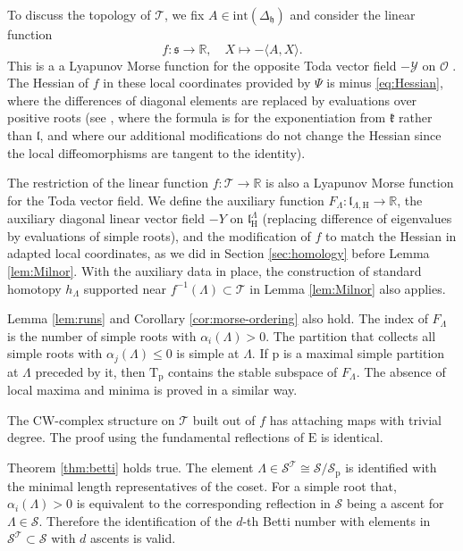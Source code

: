 \documentclass[reqno]{amsart}
\newcommand{\p}{\mathrm{p}}
\newcommand{\hh}{\mathfrak{h}}
\newcommand{\kk}{\mathfrak{k}}
\renewcommand{\ll}{\mathfrak{l}}
\renewcommand{\ss}{\mathfrak{s}}
\newcommand{\cO}{\mathcal{O}}
\newcommand{\cS}{\mathcal{S}}
\newcommand{\cT}{\mathcal{T}}
\newcommand{\cY}{\mathcal{Y}}
\newcommand{\R}{\mathbb{R}}
\newcommand{\E}{\mathrm{E}}
\newcommand{\T}{\mathbb{T}}
\renewcommand{\T}{\mathrm{T}}
\renewcommand{\H}{\mathrm{H}}
\begin{document}
To discuss the topology of $\cT$, we fix $A\in \mathrm{int}(\Delta_\hh)$ and consider the linear function
\[f:\ss\to \R,\quad X\mapsto -\langle A,X\rangle. \]
This is a a Lyapunov Morse function for the opposite  Toda vector field $-\cY$ on $\cO$ \cite[Lemma 1 and Proposition 7]{Fa}.
The Hessian of $f$ in these local coordinates provided by $\Psi$  is minus \eqref{eq:Hessian}, where the differences of diagonal elements are replaced by evaluations over positive roots (see \cite[Proposition 1.4]{DKV}, where the formula is for the exponentiation from $\kk$ rather than $\ll$, and where our additional modifications do not change the Hessian since the local diffeomorphisms are tangent to the identity).
%

The restriction of the linear function $f:\cT\to \R$
is also a Lyapunov Morse function for the Toda vector field.
We define the auxiliary function $F_\Lambda:\ll_{\Lambda,\H}\to \R$, the auxiliary diagonal linear  vector field $-Y$ on $\ll^\Lambda_\H$ (replacing difference of eigenvalues by evaluations of simple roots), and the modification of $f$ to match the Hessian in adapted local coordinates, as we did in Section \ref{sec:homology} before Lemma \ref{lem:Milnor}. With the auxiliary data in place,  the construction of standard homotopy $h_\Lambda$ supported near $f^{-1}(\Lambda)\subset \cT$ in  Lemma \ref{lem:Milnor} also applies.


Lemma \ref{lem:runs} and Corollary \ref{cor:morse-ordering} also hold. The index of $F_\Lambda$ is the number of simple roots with $\alpha_i(\Lambda)>0$. The partition  that collects all simple roots with $\alpha_j(\Lambda)\leq 0$ is simple at $\Lambda$.  If $\p$ is a maximal simple partition at $ \Lambda$ preceded by it, then  $\T_\p$ contains the stable subspace of $F_\Lambda$. The absence of local maxima and minima is proved in a similar way.



The  $\mathrm{CW}$-complex structure on $\cT$ built out of $f$ has attaching maps with trivial degree. The proof using the fundamental reflections of $\E$ is identical.

Theorem \ref{thm:betti} holds true.
The element $\Lambda\in \cS^\cT\cong \cS/\cS_{\p}$ is identified with the minimal length representatives of the coset. For a simple root that,
 $\alpha_i(\Lambda)>0$ is equivalent to the corresponding reflection in $\cS$ being  a ascent for $\Lambda \in \cS$. Therefore the identification of the $d$-th Betti number with elements in $\cS^\cT\subset \cS$  with $d$ ascents is valid.
\end{document}
